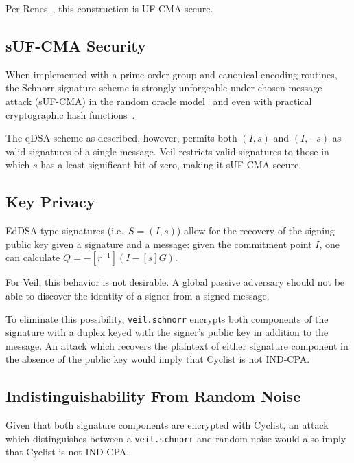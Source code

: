 Per Renes~\cite{renes2017}, this construction is UF-CMA secure.

\subsection{sUF-CMA Security}\label{subsec:veil.schnorr-suf-cma}

When implemented with a prime order group and canonical encoding routines, the Schnorr signature scheme is strongly
unforgeable under chosen message attack (sUF-CMA) in the random oracle model~\cite{pointcheval2000} and even with
practical cryptographic hash functions~\cite{neven2009}.

The qDSA scheme as described, however, permits both $(I, s)$ and $(I, -s)$ as valid signatures of a single message.
Veil restricts valid signatures to those in which $s$ has a least significant bit of zero, making it sUF-CMA secure.

\subsection{Key Privacy}\label{subsec:veil.schnorr-key-privacy}

EdDSA-type signatures (i.e.\ $S=(I,s)$) allow for the recovery of the signing public key given a signature and a
message: given the commitment point $I$, one can calculate $Q=-[r^{-1}](I - [s]G)$.

For Veil, this behavior is not desirable.
A global passive adversary should not be able to discover the identity of a signer from a signed message.

To eliminate this possibility, \texttt{veil.schnorr} encrypts both components of the signature with a duplex keyed with
the signer's public key in addition to the message.
An attack which recovers the plaintext of either signature component in the absence of the public key would imply that
Cyclist is not IND-CPA\@.

\subsection{Indistinguishability From Random Noise}\label{subsec:veil.schnorr-indistinguishability}

Given that both signature components are encrypted with Cyclist, an attack which distinguishes between a
\texttt{veil.schnorr} and random noise would also imply that Cyclist is not IND-CPA\@.
